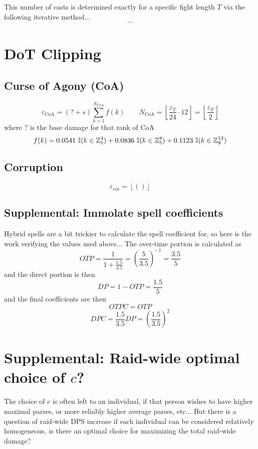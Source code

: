 This number of casts is determined exactly for a specific fight length $T$ via the following iterative method...
%
$$
\cdots
$$



\section*{DoT Clipping}

\subsection*{Curse of Agony (CoA)}
%
$$
\varepsilon_\text{CoA} = (? + s) \sum_{k=1}^{N_\text{CoA}} f(k)
\qquad
N_\text{CoA} = \left\lfloor \frac{\varepsilon_T}{24} \cdot 12 \right\rfloor = \left\lfloor \frac{\varepsilon_T}{2} \right\rfloor
$$
%
where $?$ is the base damage for that rank of CoA
%
$$
f(k) = 0.0541 \ \mathbb{I}(k \in \mathbb{Z}_1^4)
+ 0.0836 \ \mathbb{I}(k \in \mathbb{Z}_5^8)
+ 0.1123 \ \mathbb{I}(k \in \mathbb{Z}_9^{12})
$$

\subsection*{Corruption}
%
$$
\varepsilon_\text{cor} = \left\lfloor () \right\rfloor
$$



\subsection*{Supplemental: Immolate spell coefficients}
%
Hybrid spells are a bit trickier to calculate the spell coefficient for, so here is the work verifying the values used above... The over-time portion is calculated as
%
$$
OTP = \frac{1}{1 + \frac{1.5}{3.5}}
= (\frac{5}{3.5})^{-1}
= \frac{3.5}{5}
$$
%
and the direct portion is then
%
$$
DP = 1 - OTP = \frac{1.5}{5}
$$
%
and the final coefficients are then
%
$$
OTPC = OTP
$$
$$
DPC = \frac{1.5}{3.5} DP
= (\frac{1.5}{3.5})^2
$$




\section*{Supplemental: Raid-wide optimal choice of $c$?}
%
The choice of $c$ is often left to an individual, if that person wishes to have higher maximal parses, or more reliably higher average parses, etc... But there is a question of raid-wide DPS increase if each individual can be considered relatively homogeneous, is there an optimal choice for maximizing the total raid-wide damage?

